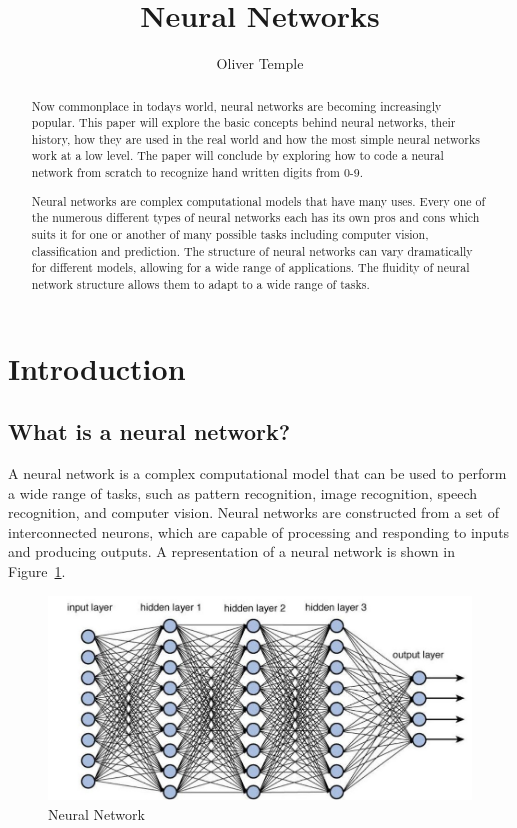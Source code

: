 \documentclass[titlepage]{article}
\title{Neural Networks}
\author{Oliver Temple}
\begin{document}
\maketitle

\begin{abstract}
    Now commonplace in todays world, neural networks are becoming increasingly popular. This paper will explore the basic concepts behind neural networks, their history, how they are used in the real world and how the most simple neural networks work at a low level. The paper will conclude by exploring how to code a neural network from scratch to recognize hand written digits from 0-9.

    Neural networks are complex computational models that have many uses. Every one of the numerous different types of neural networks each has its own pros and cons which suits it for one or another of many possible tasks including computer vision, classification and prediction. The structure of neural networks can vary dramatically for different models, allowing for a wide range of applications. The fluidity of neural network structure allows them to adapt to a wide range of tasks.
    
\end{abstract}
\tableofcontents
\newpage
\section{Introduction}
\subsection{What is a neural network?}
A neural network is a complex computational model that can be used to perform a wide range of tasks, such as pattern recognition, image recognition, speech recognition, and computer vision. Neural networks are constructed from a set of interconnected neurons, which are capable of processing and responding to inputs and producing outputs. A representation of a neural network is shown in Figure~\ref{fig:neural_network}.

\begin{figure}[h!]
    \includegraphics[width=\textwidth]{./assets/neural_network.jpeg}
    \caption{Neural Network}
    \label{fig:neural_network}
\end{figure}
\end{document}
